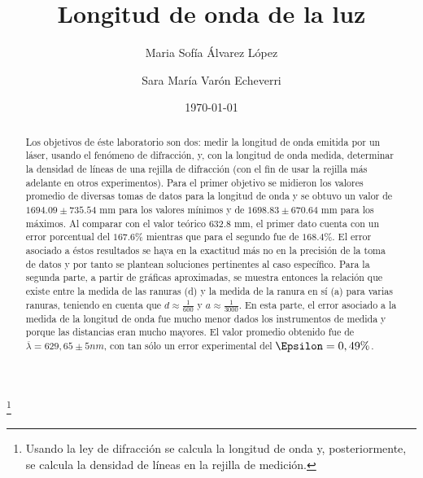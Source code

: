 \documentclass[%
 reprint,
 amsmath,amssymb,
 aps,
]{revtex4-1}
\begin{document}
\title{Longitud de onda de la luz}%
\thanks{Usando la ley de difracción se calcula la longitud de onda y, posteriormente, se calcula la densidad de líneas en la rejilla de medición.}%

\author{Maria Sofía Álvarez López}%
%

\author{Sara María Varón Echeverri}
%

\date{\today}%

\begin{abstract}
Los objetivos de éste laboratorio son dos: medir la longitud de onda emitida por un láser, usando el fenómeno de difracción, y, con la longitud de onda medida, determinar la densidad de líneas de una rejilla de difracción (con el fin de usar la rejilla más adelante en otros experimentos). Para el primer objetivo se midieron los valores promedio de diversas tomas de datos para la longitud de onda y se obtuvo un valor de $1694.09 \pm 735.54$ mm para los valores mínimos y de $1698.83 \pm 670.64$ mm para los máximos. Al comparar con el valor teórico 632.8 mm, el primer dato cuenta con un error porcentual del $167.6\%$ mientras que para el segundo fue de $168.4\%$. El error asociado a éstos resultados se haya en la exactitud más no en la precisión de la toma de datos y por tanto se plantean soluciones pertinentes al caso específico. Para la segunda parte, a partir de gráficas aproximadas, se muestra entonces la relación que existe entre la medida de las ranuras (d) y la medida de la ranura en sí (a) para varias ranuras, teniendo en cuenta que $d \approx \frac{1}{600}$ y $a \approx \frac{1}{3000}$. En esta parte, el error asociado a la medida de la longitud de onda fue mucho menor dados los instrumentos de medida y porque las distancias eran mucho mayores. El valor promedio obtenido fue de $\overline{\lambda} = 629,65  \pm 5 nm$, con tan sólo un error experimental del $\Epsilon = 0,49\%$.
\end{abstract}

\maketitle
\end{document}
